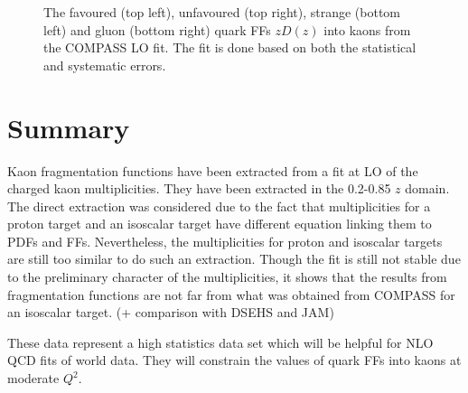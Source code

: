 \begin{figure}[!h]
	\caption{The favoured (top left), unfavoured (top right), strange (bottom left) and gluon (bottom right) quark FFs $zD(z)$ into kaons from the COMPASS LO fit. The fit is done based on both the statistical and systematic errors.}
	\label{pic:FFFit}
\end{figure}


\newpage

\section{Summary}

Kaon fragmentation functions have been extracted from a fit at LO of the charged kaon multiplicities. They have been extracted in the 0.2-0.85 $z$ domain. The direct extraction was considered due to the fact that multiplicities for a proton target and an isoscalar target have different equation linking them to PDFs and FFs. Nevertheless, the multiplicities for proton and isoscalar targets are still too similar to do such an extraction. Though the fit is still not stable due to the preliminary character of the multiplicities, it shows that the results from fragmentation functions are not far from what was obtained from COMPASS for an isoscalar target. (+ comparison with DSEHS and JAM)

These data represent a high statistics data set which will be helpful for NLO QCD fits of world data. They will constrain the values of quark FFs into kaons at moderate $Q^2$.
